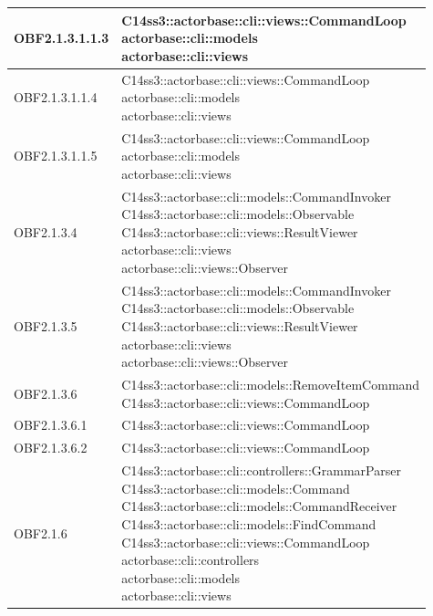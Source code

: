 \documentclass{scalatekids-article}
\begin{document}
\begin{longtable}[H]{|p{4.5cm}|p{13cm}|}
\hline
OBF2.1.3.1.1.3 & \multiLineCell[t]{C14ss3::actorbase::cli::views::CommandLoop\\actorbase::cli::models\\actorbase::cli::views\\}\\
\hline
OBF2.1.3.1.1.4 & \multiLineCell[t]{C14ss3::actorbase::cli::views::CommandLoop\\actorbase::cli::models\\actorbase::cli::views\\}\\
\hline
OBF2.1.3.1.1.5 & \multiLineCell[t]{C14ss3::actorbase::cli::views::CommandLoop\\actorbase::cli::models\\actorbase::cli::views\\}\\
\hline
OBF2.1.3.4 & \multiLineCell[t]{C14ss3::actorbase::cli::models::CommandInvoker\\C14ss3::actorbase::cli::models::Observable\\C14ss3::actorbase::cli::views::ResultViewer\\actorbase::cli::views\\actorbase::cli::views::Observer\\}\\
\hline
OBF2.1.3.5 & \multiLineCell[t]{C14ss3::actorbase::cli::models::CommandInvoker\\C14ss3::actorbase::cli::models::Observable\\C14ss3::actorbase::cli::views::ResultViewer\\actorbase::cli::views\\actorbase::cli::views::Observer\\}\\
\hline
OBF2.1.3.6 & \multiLineCell[t]{C14ss3::actorbase::cli::models::RemoveItemCommand\\C14ss3::actorbase::cli::views::CommandLoop\\}\\
\hline
OBF2.1.3.6.1 & \multiLineCell[t]{C14ss3::actorbase::cli::views::CommandLoop\\}\\
\hline
OBF2.1.3.6.2 & \multiLineCell[t]{C14ss3::actorbase::cli::views::CommandLoop\\}\\
\hline
OBF2.1.6 & \multiLineCell[t]{C14ss3::actorbase::cli::controllers::GrammarParser\\C14ss3::actorbase::cli::models::Command\\C14ss3::actorbase::cli::models::CommandReceiver\\C14ss3::actorbase::cli::models::FindCommand\\C14ss3::actorbase::cli::views::CommandLoop\\actorbase::cli::controllers\\actorbase::cli::models\\actorbase::cli::views\\}\\

\end{longtable}
\end{document}
